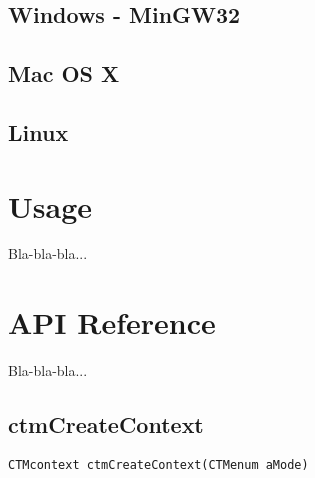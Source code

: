 \section{Windows - MinGW32}


\section{Mac OS X}


\section{Linux}


\chapter{Usage}
Bla-bla-bla...

\chapter{API Reference}
Bla-bla-bla...

\section{ctmCreateContext}
\begin{lstlisting}
CTMcontext ctmCreateContext(CTMenum aMode)
\end{lstlisting}


